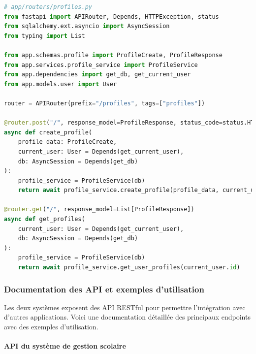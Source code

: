 \begin{lstlisting}[style=codestyle, language=Python]
# app/routers/profiles.py
from fastapi import APIRouter, Depends, HTTPException, status
from sqlalchemy.ext.asyncio import AsyncSession
from typing import List

from app.schemas.profile import ProfileCreate, ProfileResponse
from app.services.profile_service import ProfileService
from app.dependencies import get_db, get_current_user
from app.models.user import User

router = APIRouter(prefix="/profiles", tags=["profiles"])

@router.post("/", response_model=ProfileResponse, status_code=status.HTTP_201_CREATED)
async def create_profile(
    profile_data: ProfileCreate,
    current_user: User = Depends(get_current_user),
    db: AsyncSession = Depends(get_db)
):
    profile_service = ProfileService(db)
    return await profile_service.create_profile(profile_data, current_user.id)

@router.get("/", response_model=List[ProfileResponse])
async def get_profiles(
    current_user: User = Depends(get_current_user),
    db: AsyncSession = Depends(get_db)
):
    profile_service = ProfileService(db)
    return await profile_service.get_user_profiles(current_user.id)
\end{lstlisting}

\subsubsection{Documentation des API et exemples d'utilisation}

Les deux systèmes exposent des API RESTful pour permettre l'intégration avec d'autres applications. Voici une documentation détaillée des principaux endpoints avec des exemples d'utilisation.

\paragraph{API du système de gestion scolaire}

